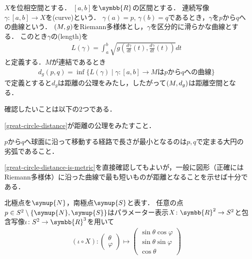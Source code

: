 \documentclass[../main.tex]{subfiles}
\begin{document}

\(X\)を位相空間とする．
\([a, b]\)を\(\symbb{R}\)の区間とする．
連続写像\(\gamma\colon [a, b] \to X\)を(curve)という．
\(\gamma(a) = p\), \(\gamma(b) = q\)であるとき，\(\gamma\)を\(p\)から\(q\)への曲線という．
\((M, g)\)をRiemann多様体とし，\(\gamma\)を区分的に滑らかな曲線とする．
このとき\(\gamma\)の(length)を
\begin{align*}
    L(\gamma) = \int_{a}^{b} \sqrt{g\left(\frac{d\gamma}{dt}(t), \frac{d\gamma}{dt}(t)\right)} dt
\end{align*}
と定義する．\(M\)が連結であるとき
\begin{align*}
    d_g(p, q) = \inf \{L(\gamma) \mid \text{\(\gamma \colon [a, b] \to M\)は\(p\)から\(q\)への曲線}\}
\end{align*}
で定義とすると\(d_g\)は距離の公理をみたし，したがって\((M, d_g)\)は距離空間となる．


確認したいことは以下の\(2\)つである．
\begin{conditions}
    \item\label{great-circle-distance-is-metric} \eqref{great-circle-distance}が距離の公理をみたすこと．
    \item \(p\)から\(q\)へ球面に沿って移動する経路で長さが最小となるのは\(p, q\)で定まる大円の劣弧であること．
\end{conditions}
\ref{great-circle-distance-is-metric}を直接確認してもよいが，一般に図形（正確にはRiemann多様体）に沿った曲線で最も短いものが距離となることを示せば十分である．


北極点を\(\symup{N}\)，南極点\(\symup{S}\)と表す．
任意の点\(p \in S^2 \setminus \{\symup{N}, \symup{S}\}\)はパラメーター表示\(X \colon \symbb{R}^2 \to S^2\)と包含写像\(\iota \colon S^2 \to \symbb{R}^3\)を用いて
\begin{align*}
    (\iota \circ X) \colon
    \begin{pmatrix}
        \theta \\
        \varphi
    \end{pmatrix}
    \mapsto
    \begin{pmatrix}
        \sin \theta \cos \varphi \\
        \sin \theta \sin \varphi \\
        \cos \theta
    \end{pmatrix}
\end{align*}
\end{document}
